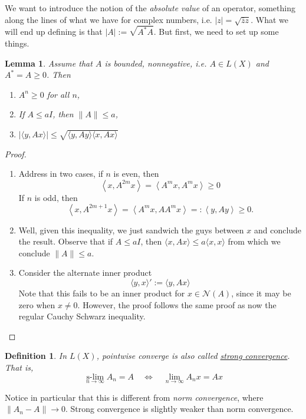 \documentclass[letterpaper,twoside,11pt]{article}
\theoremstyle{mystyle}
\newtheorem{definition}{Definition}[section]
\newtheorem{lemma}[theorem]{Lemma}
\DeclareMathOperator*{\slim}{s-lim}
\newcommand{\cg}{\color{gray}}
\begin{document}
We want to introduce the notion of the \textit{absolute value} of an operator, something along the lines of what we have for complex numbers, i.e. $|z| = \sqrt{\bar z z }$. What we will end up defining is that $|A| := \sqrt{A^* A }$. But first, we need to set up some things. 
\begin{lemma}
  Assume that $A$ is bounded, nonnegative, i.e. $A\in L(X)$ and $A^* = A \geq 0$. Then 
  \begin{enumerate}[label=(\alph*)]
    \item $A^n\geq 0$ for all $n$, 
    \item If $A\leq a I$, then $\|A\|\leq a$, 
    \item $|\langle y, Ax\rangle | \leq \sqrt{\langle y, Ay\rangle \langle x, Ax\rangle }$
  \end{enumerate}
\end{lemma}
\begin{proof}
  \begin{enumerate}[label=(\alph*)]
    \item Address in two cases, if $n$ is even, then
    \[\left\langle {x,{A^{2m}}x} \right\rangle  = \left\langle {{A^m}x,{A^m}x} \right\rangle  \geqslant 0\] 
    If $n$ is odd, then 
    \[\left\langle {x,{A^{2m + 1}}x} \right\rangle  = \left\langle {{A^m}x,A{A^m}x} \right\rangle  = :\left\langle {y,Ay} \right\rangle  \geqslant 0.\]
    \item Well, given this inequality, we just sandwich the guys between $x$ and conclude the result. Observe that if $A\leq aI$, then $\langle x, Ax\rangle \leq a \langle x, x\rangle$ from which we conclude $\|A\| \leq a$. 
    \item Consider the alternate inner product 
    \[\langle y, x\rangle ' := \langle y, Ax \rangle \]
    \cg Note that this fails to be an inner product for $x\in \mathcal N(A)$, since it may be zero when $x\neq 0$. However, the proof follows the same proof as now the regular Cauchy Schwarz inequality. 
    \end{enumerate}
\end{proof}
\begin{definition}
  In $L(X)$, pointwise converge is also called \underline{strong convergence}. That is, 
  \[\slim\limits_{n \to \infty } {A_n} = A\quad  \Longleftrightarrow \quad \mathop {\lim }\limits_{n \to \infty } {A_n}x = Ax\]
\end{definition}
Notice in particular that this is different from \textit{norm convergence}, where $\|A_n - A\|\to 0$. Strong convergence is slightly weaker than norm convergence. 
\end{document}
